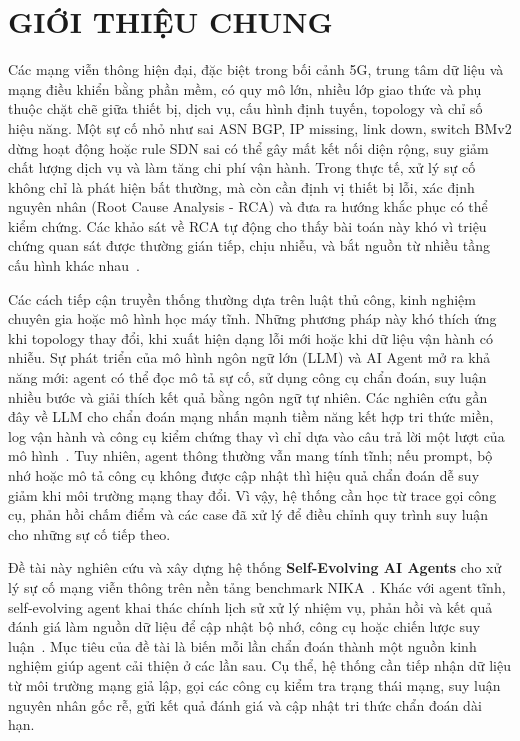 \section{GIỚI THIỆU CHUNG}

Các mạng viễn thông hiện đại, đặc biệt trong bối cảnh 5G, trung tâm dữ liệu và mạng điều khiển bằng phần mềm, có quy mô lớn, nhiều lớp giao thức và phụ thuộc chặt chẽ giữa thiết bị, dịch vụ, cấu hình định tuyến, topology và chỉ số hiệu năng. Một sự cố nhỏ như sai ASN BGP, IP missing, link down, switch BMv2 dừng hoạt động hoặc rule SDN sai có thể gây mất kết nối diện rộng, suy giảm chất lượng dịch vụ và làm tăng chi phí vận hành. Trong thực tế, xử lý sự cố không chỉ là phát hiện bất thường, mà còn cần định vị thiết bị lỗi, xác định nguyên nhân (Root Cause Analysis - RCA) và đưa ra hướng khắc phục có thể kiểm chứng. Các khảo sát về RCA tự động cho thấy bài toán này khó vì triệu chứng quan sát được thường gián tiếp, chịu nhiễu, và bắt nguồn từ nhiều tầng cấu hình khác nhau~\citep{rca_survey2023}.

Các cách tiếp cận truyền thống thường dựa trên luật thủ công, kinh nghiệm chuyên gia hoặc mô hình học máy tĩnh. Những phương pháp này khó thích ứng khi topology thay đổi, khi xuất hiện dạng lỗi mới hoặc khi dữ liệu vận hành có nhiễu. Sự phát triển của mô hình ngôn ngữ lớn (LLM) và AI Agent mở ra khả năng mới: agent có thể đọc mô tả sự cố, sử dụng công cụ chẩn đoán, suy luận nhiều bước và giải thích kết quả bằng ngôn ngữ tự nhiên. Các nghiên cứu gần đây về LLM cho chẩn đoán mạng nhấn mạnh tiềm năng kết hợp tri thức miền, log vận hành và công cụ kiểm chứng thay vì chỉ dựa vào câu trả lời một lượt của mô hình~\citep{llm_network2024}. Tuy nhiên, agent thông thường vẫn mang tính tĩnh; nếu prompt, bộ nhớ hoặc mô tả công cụ không được cập nhật thì hiệu quả chẩn đoán dễ suy giảm khi môi trường mạng thay đổi. Vì vậy, hệ thống cần học từ trace gọi công cụ, phản hồi chấm điểm và các case đã xử lý để điều chỉnh quy trình suy luận cho những sự cố tiếp theo.

Đề tài này nghiên cứu và xây dựng hệ thống \textbf{Self-Evolving AI Agents} cho xử lý sự cố mạng viễn thông trên nền tảng benchmark NIKA~\citep{nika2025}. Khác với agent tĩnh, self-evolving agent khai thác chính lịch sử xử lý nhiệm vụ, phản hồi và kết quả đánh giá làm nguồn dữ liệu để cập nhật bộ nhớ, công cụ hoặc chiến lược suy luận~\citep{selfevolving2025}. Mục tiêu của đề tài là biến mỗi lần chẩn đoán thành một nguồn kinh nghiệm giúp agent cải thiện ở các lần sau. Cụ thể, hệ thống cần tiếp nhận dữ liệu từ môi trường mạng giả lập, gọi các công cụ kiểm tra trạng thái mạng, suy luận nguyên nhân gốc rễ, gửi kết quả đánh giá và cập nhật tri thức chẩn đoán dài hạn.

